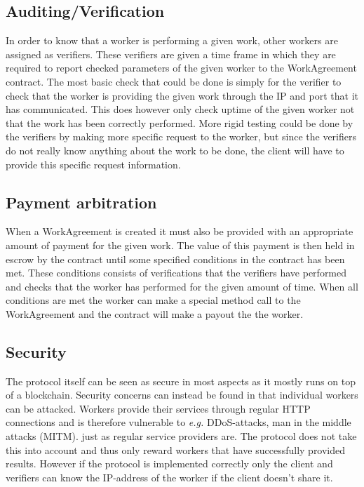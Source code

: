 \subsection{Auditing/Verification}
\label{sec:res:auditing}
In order to know that a worker is performing a given work, other workers are assigned as verifiers. These verifiers are given a time frame in which they are required to report checked parameters of the given worker to the WorkAgreement contract. The most basic check that could be done is simply for the verifier to check that the worker is providing the given work through the IP and port that it has communicated. This does however only check uptime of the given worker not that the work has been correctly performed. More rigid testing could be done by the verifiers by making more specific request to the worker, but since the verifiers do not really know anything about the work to be done, the client will have to provide this specific request information.

\subsection{Payment arbitration}
When a WorkAgreement is created it must also be provided with an appropriate amount of payment for the given work. The value of this payment is then held in escrow by the contract until some specified conditions in the contract has been met. These conditions consists of verifications that the verifiers have performed and checks that the worker has performed for the given amount of time. When all conditions are met the worker can make a special method call to the WorkAgreement and the contract will make a payout the the worker.

\subsection{Security}
The protocol itself can be seen as secure in most aspects as it mostly runs on top of a blockchain. Security concerns can instead be found in that individual workers can be attacked. Workers provide their services through regular HTTP connections and is therefore vulnerable to \textit{e.g.} DDoS-attacks, man in the middle attacks (MITM). just as regular service providers are. The protocol does not take this into account and thus only reward workers that have successfully provided results. However if the protocol is implemented correctly only the client and verifiers can know the IP-address of the worker if the client doesn't share it.

